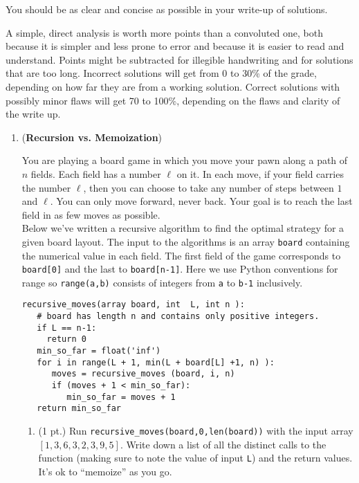 \documentclass[letterpaper,11pt]{article}
\begin{document}
You should be as clear and concise as possible in your write-up of
solutions. 

A simple, direct analysis is worth more points than a
convoluted one, both because it is simpler and less prone to error and
because it is easier to read and understand. Points might be
subtracted for illegible handwriting and for solutions that are too
long. Incorrect solutions will get from 0 to 30\% of the grade,
depending on how far they are from a working solution. Correct
solutions with possibly minor flaws will get 70 to 100\%, depending on
the flaws and clarity of the write up.

\newpage 
\begin{enumerate}
\item (\textbf{Recursion vs. Memoization})

You are playing a board game in which you move your pawn along a path of  $n$ fields. Each field has a number $\ell$ on it. In each move, if your field carries the number $\ell$, then you can choose to take any number of steps between  $1$ and $\ell$. You can only move forward, never back. Your goal is to reach the last field in as few moves as possible. \\
Below we've written a recursive algorithm to find the optimal strategy for a given
board layout. The input to the algorithms is an array \texttt{board}
containing the numerical value in each field. The first field of the
game corresponds to \texttt{board[0]} and the last to
\texttt{board[n-1]}. Here we use Python conventions for range so
\texttt{range(a,b)} consists of integers from \texttt{a} to
\texttt{b-1} inclusively.

\begin{verbatim}
recursive_moves(array board, int  L, int n ):
   # board has length n and contains only positive integers.
   if L == n-1:
     return 0
   min_so_far = float('inf')
   for i in range(L + 1, min(L + board[L] +1, n) ): 
      moves = recursive_moves (board, i, n) 
      if (moves + 1 < min_so_far): 
         min_so_far = moves + 1
   return min_so_far
\end{verbatim}

\begin{enumerate}\renewcommand{\theenumi}{1.\arabic{enumi}}
\item (1 pt.) Run \texttt{recursive\_moves(board,0,len(board))} with
  the input array $ [1, 3, 6, 3, 2, 3, 9, 5]$. Write down
  a list of all the distinct calls to the function (making sure to note the value of
  input \texttt{L}) and the return values. It's ok to ``memoize'' as
  you go. 


\end{enumerate}
\end{enumerate}
\end{document}
